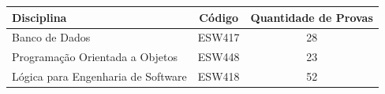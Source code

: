 \documentclass[12pt,a4paper]{article}
\begin{document}
\begin{table}[H]
\centering
\begin{tabular}{l c c}
\hline
\textbf{Disciplina} & \textbf{Código} & \textbf{Quantidade de Provas} \\
\hline
Banco de Dados & ESW417 & 28 \\
Programação Orientada a Objetos & ESW448 & 23 \\
Lógica para Engenharia de Software & ESW418 & 52 \\
\hline 
\end{tabular}
\end{table}
\end{document}
